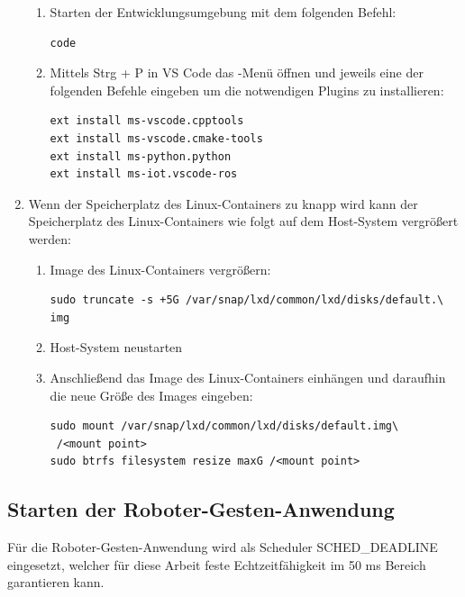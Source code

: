 \begin{enumerate}[label*=\arabic*.]
\begin{enumerate}[label*=\arabic*.]
            \item Starten der Entwicklungsumgebung mit dem folgenden Befehl:
                \begin{lstlisting}[style=bash]
code
                \end{lstlisting}

            \item Mittels Strg + P in VS Code das -Menü öffnen und jeweils eine der folgenden Befehle eingeben um die notwendigen Plugins zu installieren:
                \begin{lstlisting}[style=bash]
ext install ms-vscode.cpptools
ext install ms-vscode.cmake-tools
ext install ms-python.python
ext install ms-iot.vscode-ros
                \end{lstlisting}
        \end{enumerate}

        \item Wenn der Speicherplatz des Linux-Containers zu knapp wird kann der Speicherplatz des Linux-Containers wie folgt auf dem Host-System vergrößert werden:
            \begin{enumerate}[label*=\arabic*.]
                \item Image des Linux-Containers vergrößern:
                    \begin{lstlisting}[style=bash]
sudo truncate -s +5G /var/snap/lxd/common/lxd/disks/default.\
img
                    \end{lstlisting}

                \item Host-System neustarten

                \item Anschließend das Image des Linux-Containers einhängen und daraufhin die neue Größe des Images eingeben:
                    \begin{lstlisting}[style=bash]
sudo mount /var/snap/lxd/common/lxd/disks/default.img\
 /<mount point>
sudo btrfs filesystem resize maxG /<mount point>
                    \end{lstlisting}
            \end{enumerate}
\end{enumerate}


\subsection{Starten der Roboter-Gesten-Anwendung}
Für die Roboter-Gesten-Anwendung wird als Scheduler SCHED\_DEADLINE eingesetzt, welcher für diese Arbeit feste Echtzeitfähigkeit im 50 ms Bereich garantieren kann.

